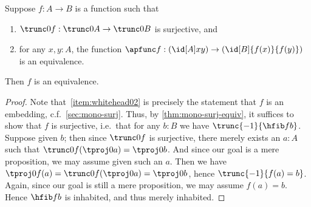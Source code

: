%
\begin{thm}\label{thm:whitehead0}
  Suppose $f:A\to B$ is a function such that
  \begin{enumerate}
  \item $\trunc0 f : \trunc0 A \to \trunc0 B$ is surjective, and\label{item:whitehead01}
  \item for any $x,y:A$, the function $\apfunc f : (\id[A]xy) \to (\id[B]{f(x)}{f(y)})$ is an equivalence.\label{item:whitehead02}
  \end{enumerate}
  Then $f$ is an equivalence.
\end{thm}

\begin{proof}
  Note that~\ref{item:whitehead02} is precisely the statement that $f$ is an embedding, c.f.~\cref{sec:mono-surj}.
  Thus, by \cref{thm:mono-surj-equiv}, it suffices to show that $f$ is surjective, i.e.\ that for any $b:B$ we have $\trunc{-1}{\hfib f b}$.
  Suppose given $b$; then since $\trunc0 f$ is surjective, there merely exists an $a:A$ such that $\trunc 0 f(\tproj0a) = \tproj0b$.
  And since our goal is a mere proposition, we may assume given such an $a$.
  Then we have $\tproj0{f(a)} = \trunc 0 f(\tproj0a) =\tproj0b$, hence $\trunc{-1}{f(a)=b}$.
  Again, since our goal is still a mere proposition, we may assume $f(a)=b$.
  Hence $\hfib f b$ is inhabited, and thus merely inhabited.
\end{proof}
